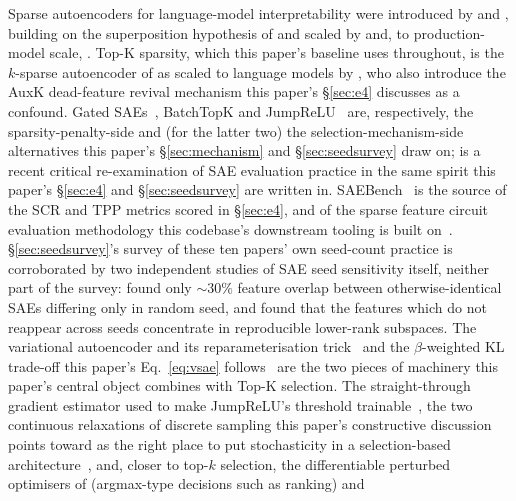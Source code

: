 \documentclass[11pt]{article}
\begin{document}
Sparse autoencoders for language-model interpretability were introduced by
\citet{sharkey2022taking} and \citet{cunningham2023sparse}, building on the
superposition hypothesis of \citet{elhage2022superposition} and scaled by
\citet{bricken2023monosemanticity} and, to production-model scale,
\citet{templeton2024scaling}. Top-K sparsity, which this paper's baseline
uses throughout, is the $k$-sparse autoencoder of
\citet{makhzani2013ksparse} as scaled to language models by
\citet{gao2024scalingevaluatingsparseautoencoders}, who also introduce the
AuxK dead-feature revival mechanism this paper's \S\ref{sec:e4} discusses as
a confound. Gated SAEs~\citep{rajamanoharan2024gated}, BatchTopK
\citep{bussmann2024batchtopk} and JumpReLU~\citep{rajamanoharan2024jumprelu}
are, respectively, the sparsity-penalty-side and (for the latter two) the
selection-mechanism-side alternatives this paper's \S\ref{sec:mechanism} and
\S\ref{sec:seedsurvey} draw on; \citet{lu2025sparseautoencodersagain} is a
recent critical re-examination of SAE evaluation practice in the same spirit
this paper's \S\ref{sec:e4} and \S\ref{sec:seedsurvey} are written in.
SAEBench~\citep{karvonen2025saebenchcomprehensivebenchmarksparse} is the
source of the SCR and TPP metrics scored in \S\ref{sec:e4}, and of the
sparse feature circuit evaluation methodology this codebase's downstream
tooling is built on~\citep{marks2025sparsefeaturecircuitsdiscovering}.
\S\ref{sec:seedsurvey}'s survey of these ten papers' own seed-count
practice is corroborated by two independent studies of SAE seed
sensitivity itself, neither part of the survey: \citet{paulo2025sae} found
only $\sim30\%$ feature overlap between otherwise-identical SAEs differing
only in random seed, and \citet{gerasimov2026unstable} found that the
features which do not reappear across seeds concentrate in reproducible
lower-rank subspaces. The
variational autoencoder and its reparameterisation
trick~\citep{kingma2013autoencoding} and the $\beta$-weighted KL trade-off
this paper's Eq.~\ref{eq:vsae} follows~\citep{higgins2017betavae} are the two
pieces of machinery this paper's central object combines with Top-K
selection. The straight-through gradient estimator used to make JumpReLU's
threshold trainable~\citep{bengio2013estimating}, the two continuous
relaxations of discrete sampling this paper's constructive discussion points
toward as the right place to put stochasticity in a
selection-based architecture~\citep{jang2016categorical,maddison2016concrete},
and, closer to top-$k$ selection, the differentiable perturbed optimisers
of \citet{berthet2020learning} (argmax-type decisions such as ranking) and
\end{document}
